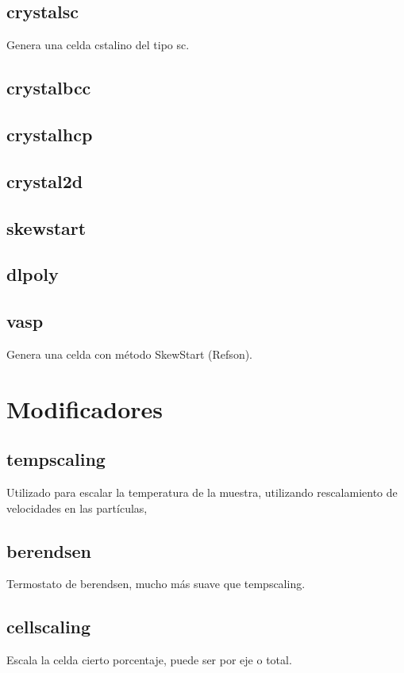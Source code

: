 \subsection{crystalsc}
Genera una celda cstalino del tipo sc.
\subsection{crystalbcc}
\subsection{crystalhcp}
\subsection{crystal2d}
\subsection{skewstart}
\subsection{dlpoly}
\subsection{vasp}
Genera una celda con m\'etodo SkewStart (Refson).
\section{Modificadores}
\subsection{tempscaling}

Utilizado para escalar la temperatura de la muestra, utilizando rescalamiento de velocidades en las part\'iculas, 

\subsection{berendsen}
Termostato de berendsen, mucho m\'as suave que tempscaling.
\subsection{cellscaling}
Escala la celda cierto porcentaje, puede ser por eje o total.


